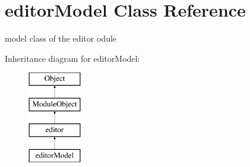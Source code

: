 \hypertarget{classeditorModel}{}\section{editor\+Model Class Reference}
\label{classeditorModel}


model class of the editor odule  


Inheritance diagram for editor\+Model\+:\begin{figure}[H]
\begin{center}
\leavevmode
\includegraphics[height=4.000000cm]{classeditorModel}
\end{center}
\end{figure}
